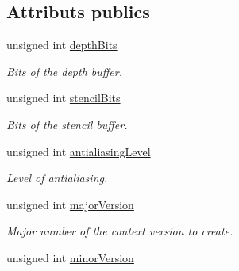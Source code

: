 \subsection*{Attributs publics}
\begin{DoxyCompactItemize}
\item 
\mbox{\label{structsf_1_1ContextSettings_a4809e22089c2af7276b8809b5aede7bb}} 
unsigned int \hyperlink{structsf_1_1ContextSettings_a4809e22089c2af7276b8809b5aede7bb}{depth\+Bits}
\begin{DoxyCompactList}\small\item\em Bits of the depth buffer. \end{DoxyCompactList}\item 
\mbox{\label{structsf_1_1ContextSettings_ac2e788c201ca20e84fd38a28071abd29}} 
unsigned int \hyperlink{structsf_1_1ContextSettings_ac2e788c201ca20e84fd38a28071abd29}{stencil\+Bits}
\begin{DoxyCompactList}\small\item\em Bits of the stencil buffer. \end{DoxyCompactList}\item 
\mbox{\label{structsf_1_1ContextSettings_ac4a097be18994dba38d73f36b0418bdc}} 
unsigned int \hyperlink{structsf_1_1ContextSettings_ac4a097be18994dba38d73f36b0418bdc}{antialiasing\+Level}
\begin{DoxyCompactList}\small\item\em Level of antialiasing. \end{DoxyCompactList}\item 
\mbox{\label{structsf_1_1ContextSettings_a99a680d5c15a7e34c935654155dd5166}} 
unsigned int \hyperlink{structsf_1_1ContextSettings_a99a680d5c15a7e34c935654155dd5166}{major\+Version}
\begin{DoxyCompactList}\small\item\em Major number of the context version to create. \end{DoxyCompactList}\item 
\mbox{\label{structsf_1_1ContextSettings_aaeb0efe9d2658b840da93b30554b100f}} 
unsigned int \hyperlink{structsf_1_1ContextSettings_aaeb0efe9d2658b840da93b30554b100f}{minor\+Version}

\end{DoxyCompactItemize}
